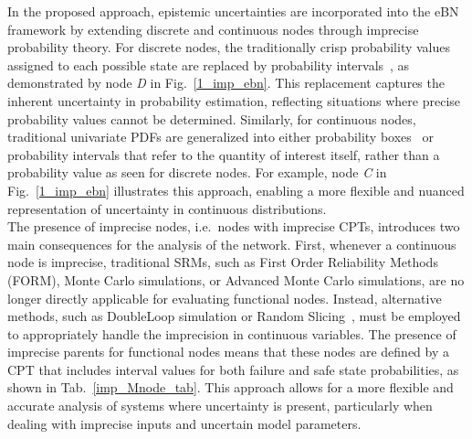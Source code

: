 In the proposed approach, epistemic uncertainties are incorporated into the eBN framework by extending discrete and continuous nodes through imprecise probability theory.
For discrete nodes, the traditionally crisp probability values assigned to each possible state are replaced by probability intervals~\cite{weichselberger_theory_2000}, as demonstrated by node \textit{D} in Fig.~\ref{1_imp_ebn}. 
This replacement captures the inherent uncertainty in probability estimation, reflecting situations where precise probability values cannot be determined. Similarly, for continuous nodes, traditional univariate PDFs are generalized into either probability boxes~\cite{ferson_2003} or probability intervals that refer to the quantity of interest itself, rather than a probability value as seen for discrete nodes. 
For example, node \textit{C} in Fig.~\ref{1_imp_ebn} illustrates this approach, enabling a more flexible and nuanced representation of uncertainty in continuous distributions.\\

The presence of imprecise nodes, i.e.\ nodes with imprecise CPTs, introduces two main consequences for the analysis of the network. 
First, whenever a continuous node is imprecise, traditional SRMs, such as First Order Reliability Methods (FORM), Monte Carlo simulations, or Advanced Monte Carlo simulations, are no longer directly applicable for evaluating functional nodes. 
Instead, alternative methods, such as DoubleLoop simulation or Random Slicing~\cite{ALVAREZ_randomslicing}, must be employed to appropriately handle the imprecision in continuous variables. 
The presence of imprecise parents for functional nodes means that these nodes are defined by a CPT that includes interval values for both failure and safe state probabilities, as shown in Tab.~\ref{imp_Mnode_tab}. 
This approach allows for a more flexible and accurate analysis of systems where uncertainty is present, particularly when dealing with imprecise inputs and uncertain model parameters.

